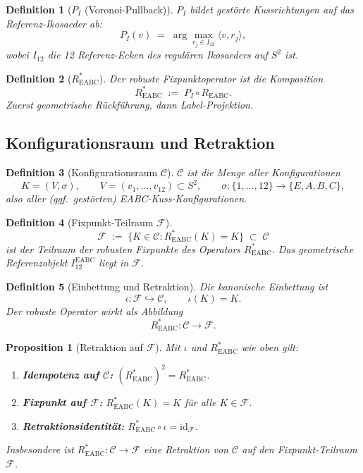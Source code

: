 \documentclass[11pt,a4paper]{article}
\newtheorem{definition}{Definition}
\newtheorem{proposition}{Proposition}
\begin{document}
\begin{definition}[$P_I$ (Voronoi-Pullback)]
$P_I$ bildet gestörte Kussrichtungen auf das Referenz-Ikosaeder ab:
\[
  P_I(v) \;=\; \arg\max_{r_j\in I_{12}} \langle v, r_j\rangle,
\]
wobei $I_{12}$ die 12 Referenz-Ecken des regulären Ikosaeders auf $S^2$ ist.
\end{definition}

\begin{definition}[$R^*_{\mathrm{EABC}}$]
Der robuste Fixpunktoperator ist die Komposition
\[
  R^*_{\mathrm{EABC}} \;:=\; P_I \circ R_{\mathrm{EABC}}.
\]
Zuerst geometrische Rückführung, dann Label-Projektion.
\end{definition}

\subsection{Konfigurationsraum und Retraktion}

\begin{definition}[Konfigurationsraum $\mathcal{C}$]
$\mathcal{C}$ ist die Menge aller Konfigurationen
\[
  K=(V,\sigma),
  \qquad
  V=(v_1,\ldots,v_{12})\subset S^2,
  \qquad
  \sigma\colon\{1,\ldots,12\}\to\{E,A,B,C\},
\]
also aller (ggf.\ gestörten) EABC-Kuss-Konfigurationen.
\end{definition}

\begin{definition}[Fixpunkt-Teilraum $\mathcal{F}$]
\[
  \mathcal{F}
  \;:=\;
  \bigl\{K\in\mathcal{C} : R^*_{\mathrm{EABC}}(K)=K\bigr\}
  \;\subset\;
  \mathcal{C}
\]
ist der Teilraum der \emph{robusten Fixpunkte} des Operators $R^*_{\mathrm{EABC}}$.
Das geometrische Referenzobjekt $I_{12}^{\mathrm{EABC}}$ liegt in $\mathcal{F}$.
\end{definition}

\begin{definition}[Einbettung und Retraktion]
Die kanonische Einbettung ist
\[
  \iota\colon \mathcal{F}\hookrightarrow \mathcal{C},\qquad \iota(K)=K.
\]
Der robuste Operator wirkt als Abbildung
\[
  R^*_{\mathrm{EABC}}\colon \mathcal{C}\longrightarrow \mathcal{F}.
\]
\end{definition}

\begin{proposition}[Retraktion auf $\mathcal{F}$]
\label{prop:retraction}
Mit $\iota$ und $R^*_{\mathrm{EABC}}$ wie oben gilt:
\begin{enumerate}
\item[(a)] \textbf{Idempotenz auf $\mathcal{C}$:}
  $(R^*_{\mathrm{EABC}})^2 = R^*_{\mathrm{EABC}}$.
\item[(b)] \textbf{Fixpunkt auf $\mathcal{F}$:}
  $R^*_{\mathrm{EABC}}(K)=K$ für alle $K\in\mathcal{F}$.
\item[(c)] \textbf{Retraktionsidentität:}
  $R^*_{\mathrm{EABC}}\circ \iota = \mathrm{id}_{\mathcal{F}}$.
\end{enumerate}
Insbesondere ist $R^*_{\mathrm{EABC}}\colon\mathcal{C}\to\mathcal{F}$ eine
\emph{Retraktion} von $\mathcal{C}$ auf den Fixpunkt-Teilraum $\mathcal{F}$.
\end{proposition}
\end{document}
